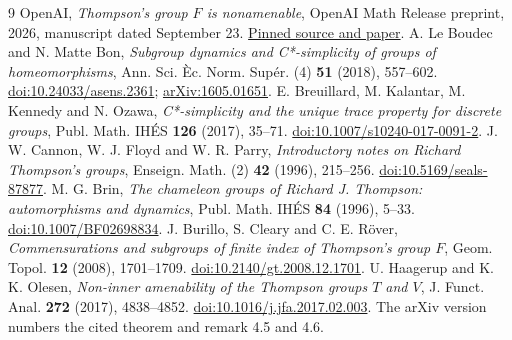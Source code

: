 \documentclass[11pt]{article}
\begin{document}
\begin{thebibliography}{9}
 OpenAI, \emph{Thompson's group $F$ is nonamenable}, OpenAI Math Release preprint, 2026, manuscript dated September 23. \href{https://github.com/openai/math/blob/adc7f1241b42e322a6451854ab7e4b4c146bf78a/preprints/Thompsons-group-F-is-nonamenable-September-23-2026/paper.pdf}{Pinned source and paper}.
 A. Le Boudec and N. Matte Bon, \emph{Subgroup dynamics and C*-simplicity of groups of homeomorphisms}, Ann. Sci. \`Ec. Norm. Sup\'er. (4) \textbf{51} (2018), 557--602. \href{https://doi.org/10.24033/asens.2361}{doi:10.24033/asens.2361}; \href{https://arxiv.org/abs/1605.01651}{arXiv:1605.01651}.
 E. Breuillard, M. Kalantar, M. Kennedy and N. Ozawa, \emph{C*-simplicity and the unique trace property for discrete groups}, Publ. Math. IH\'ES \textbf{126} (2017), 35--71. \href{https://doi.org/10.1007/s10240-017-0091-2}{doi:10.1007/s10240-017-0091-2}.
 J. W. Cannon, W. J. Floyd and W. R. Parry, \emph{Introductory notes on Richard Thompson's groups}, Enseign. Math. (2) \textbf{42} (1996), 215--256. \href{https://doi.org/10.5169/seals-87877}{doi:10.5169/seals-87877}.
 M. G. Brin, \emph{The chameleon groups of Richard J. Thompson: automorphisms and dynamics}, Publ. Math. IH\'ES \textbf{84} (1996), 5--33. \href{https://doi.org/10.1007/BF02698834}{doi:10.1007/BF02698834}.
 J. Burillo, S. Cleary and C. E. R\"over, \emph{Commensurations and subgroups of finite index of Thompson's group $F$}, Geom. Topol. \textbf{12} (2008), 1701--1709. \href{https://doi.org/10.2140/gt.2008.12.1701}{doi:10.2140/gt.2008.12.1701}.
 U. Haagerup and K. K. Olesen, \emph{Non-inner amenability of the Thompson groups $T$ and $V$}, J. Funct. Anal. \textbf{272} (2017), 4838--4852. \href{https://doi.org/10.1016/j.jfa.2017.02.003}{doi:10.1016/j.jfa.2017.02.003}. The arXiv version numbers the cited theorem and remark 4.5 and 4.6.
\end{thebibliography}
\end{document}
